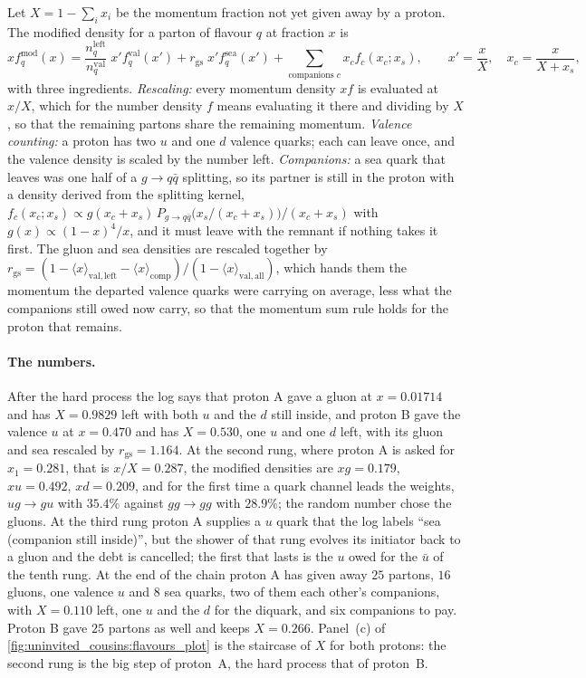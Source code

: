 Let $X=1-\sum_i x_i$ be the momentum fraction not yet given away by a
proton. The modified density for a parton of flavour $q$ at fraction $x$ is
\begin{equation}
    xf_q^{\mathrm{mod}}(x)=
    \frac{n_q^{\mathrm{left}}}{n_q^{\mathrm{val}}}\;x'f_q^{\mathrm{val}}(x')
    +r_{\mathrm{gs}}\;x'f_q^{\mathrm{sea}}(x')
    +\sum_{\text{companions }c}x_cf_c(x_c;x_s),
  \qquad x'=\frac{x}{X},\quad x_c=\frac{x}{X+x_s},
  \label{eq:uninvited_cousins:depleted}
\end{equation}
with three ingredients. \emph{Rescaling:} every momentum density $xf$ is evaluated at $x/X$, which
for the number density $f$ means evaluating it there and dividing by $X$, so
that the remaining partons share the remaining momentum. \emph{Valence counting:} a proton has two $u$ and one $d$ valence
quarks; each can leave once, and the valence density is scaled by the
number left. \emph{Companions:} a sea quark that leaves was one half of a
$g\to q\bar q$ splitting, so its partner is still in the proton with a
density derived from the splitting kernel,
$f_c(x_c;x_s)\propto g(x_c+x_s)\,P_{g\to q\bar q}\bigl(x_s/(x_c+x_s)\bigr)/(x_c+x_s)$
with $g(x)\propto(1-x)^4/x$, and it must leave with the remnant if nothing
takes it first. The gluon and sea densities are rescaled together by
$r_{\mathrm{gs}}=(1-\langle x\rangle_{\mathrm{val,left}}-\langle x\rangle_{\mathrm{comp}})/(1-\langle x\rangle_{\mathrm{val,all}})$,
which hands them the momentum the departed valence quarks were carrying on
average, less what the companions still owed now carry, so
that the momentum sum rule holds for the proton that remains.

\paragraph{The numbers.} After the hard process the log says that proton A
gave a gluon at $x=0.01714$ and has $X=0.9829$ left with both $u$ and the
$d$ still inside, and proton B gave the valence $u$ at $x=0.470$ and has
$X=0.530$, one $u$ and one $d$ left, with its gluon and sea rescaled by
$r_{\mathrm{gs}}=1.164$. At the second rung, where proton A is asked for
$x_1=0.281$, that is $x/X=0.287$, the modified densities are $xg=0.179$,
$xu=0.492$, $xd=0.209$, and for the first time a quark channel leads the
weights, $ug\to gu$ with $35.4\%$ against $gg\to gg$ with $28.9\%$; the
random number chose the gluons. At the third rung proton A supplies a $u$
quark that the log labels ``sea (companion still inside)'', but the shower
of that rung evolves its initiator back to a gluon and the debt is
cancelled; the first that lasts is the $u$ owed for the $\bar u$ of the
tenth rung. At the end of the chain proton A has given away $25$ partons,
$16$ gluons, one valence $u$ and $8$ sea quarks, two of them each other's
companions, with $X=0.110$ left, one $u$ and the $d$ for the diquark, and
six companions to pay. Proton B gave $25$ partons as well and keeps
$X=0.266$. Panel~(c) of \cref{fig:uninvited_cousins:flavours_plot} is the
staircase of $X$ for both protons: the second rung is the big step of
proton~A, the hard process that of proton~B.

